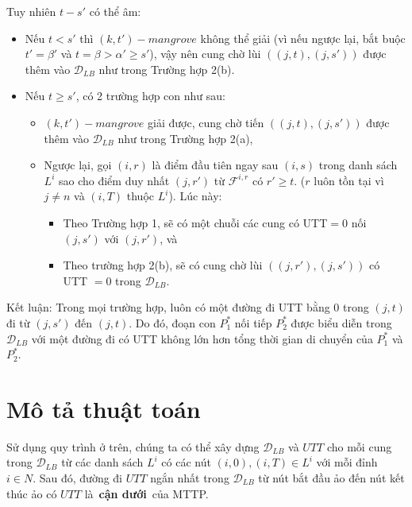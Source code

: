 \documentclass[../main.tex]{subfiles}
\begin{document}
Tuy nhiên \(t-s'\) có thể âm:

\begin{itemize}
\tightlist
\item
  Nếu \(t<s'\) thì \((k,t')-mangrove\) không thể giải (vì nếu ngược lại,
  bắt buộc \(t'=\beta'\) và \(t=\beta>\alpha'\geq s'\)), vậy nên cung
  chờ lùi \(((j,t),(j,s'))\) được thêm vào \(\mathcal D_{LB}\) như trong
  Trường hợp 2(b).
\item
  Nếu \(t\geq s'\), có 2 trường hợp con như sau:

  \begin{itemize}
  \tightlist
  \item
    \((k,t')-mangrove\) giải được, cung chờ tiến \(((j,t),(j,s'))\) được
    thêm vào \(\mathcal D_{LB}\) như trong Trường hợp 2(a),
  \item
    Ngược lại, gọi \((i,r)\) là điểm đầu tiên ngay sau \((i,s)\) trong
    danh sách \(L^i\) sao cho điểm duy nhất \((j,r')\) từ
    \(\mathcal F^{i,r}\) có \(r' \geq t\). (\(r\) luôn tồn tại vì
    \(j\neq n\) và \((i,T)\) thuộc \(L^i\)). Lúc này:

    \begin{itemize}
    \tightlist
    \item
      Theo Trường hợp 1, sẽ có một chuỗi các cung có UTT\(=0\) nối
      \((j,s')\) với \((j,r')\), và
    \item
      Theo trường hợp 2(b), sẽ có cung chờ lùi \(((j, r'), (j, s'))\) có
      UTT \(=0\) trong \(\mathcal D_{LB}\).
    \end{itemize}
  \end{itemize}
\end{itemize}

Kết luận: Trong mọi trường hợp, luôn có một đường đi UTT bằng 0 trong
\((j, t)\) đi từ \((j, s')\) đến \((j, t)\). Do đó, đoạn con \(P_1^*\)
nối tiếp \(P_2^*\) được biểu diễn trong \(\mathcal D_{LB}\) với một
đường đi có UTT không lớn hơn tổng thời gian di chuyển của \(P_1^*\) và
\(P_2^*\).

\section{Mô tả thuật toán}\label{muxf4-tux1ea3-thuux1eadt-touxe1n}

\begin{proposition}
Sử dụng quy trình ở trên, chúng ta có thể xây dựng
\(\mathcal D_{LB}\) và \(UTT\) cho mỗi cung trong \(\mathcal D_{LB}\) từ
các danh sách \(L^i\) có các nút \((i,0),(i,T) \in L^i\) với mỗi đỉnh
\(i \in N\). Sau đó, đường đi \(UTT\) ngắn nhất trong
\(\mathcal D_{LB}\) từ nút bắt đầu ảo đến nút kết thúc ảo có \(UTT\)
là~\textbf{cận dưới}~của MTTP.
\end{proposition}
\end{document}
